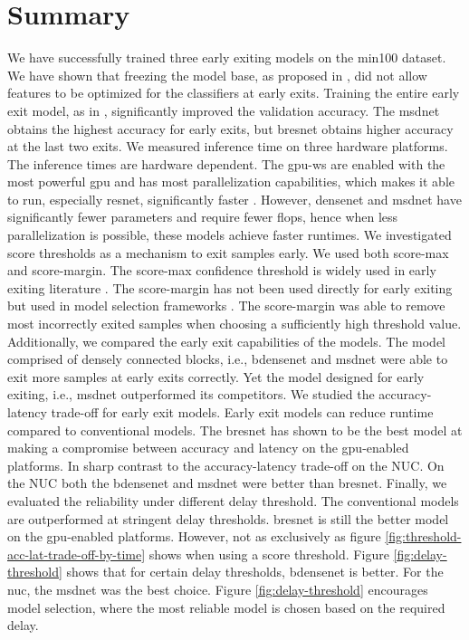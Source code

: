\section{Summary} \label{sec:ee-summary}
We have successfully trained three early exiting models on the \gls{min100} dataset. We have shown that freezing the model base, as proposed in \cite{leroux_resource-constrained_2015}, did not allow features to be optimized for the classifiers at early exits. Training the entire early exit model, as in \cite{teerapittayanon_branchynet:_2016}, significantly improved the validation accuracy. The \gls{msdnet} obtains the highest accuracy for early exits, but \gls{bresnet} obtains higher accuracy at the last two exits. 
We measured inference time on three hardware platforms. The inference times are hardware dependent. The \gls{gpu-ws} are enabled with the most powerful \gls{gpu} and has most parallelization capabilities, which makes it able to run, especially \gls{resnet}, significantly faster \cite{lee_energy_2019}. However, \gls{densenet} and \gls{msdnet} have significantly fewer parameters and require fewer \gls{flop}s, hence when less parallelization is possible, these models achieve faster runtimes.
We investigated score thresholds as a mechanism to exit samples early. We used both score-max and score-margin. The score-max confidence threshold is widely used in early exiting literature \cite{leroux_resource-constrained_2015, leroux_cascading_2017, kaya_shallow-deep_nodate, berestizshevsky_sacrificing_2019}. The score-margin has not been used directly for early exiting but used in model selection frameworks \cite{park_big/little_2015,tann_flexible_2018}. The score-margin was able to remove most incorrectly exited samples when choosing a sufficiently high threshold value. Additionally, we compared the early exit capabilities of the models. The model comprised of densely connected blocks, i.e., \gls{bdensenet} and \gls{msdnet} were able to exit more samples at early exits correctly. Yet the model designed for early exiting, i.e., \gls{msdnet} outperformed its competitors. 
We studied the accuracy-latency trade-off for early exit models. Early exit models can reduce runtime compared to conventional models. The \gls{bresnet} has shown to be the best model at making a compromise between accuracy and latency on the \gls{gpu}-enabled platforms. In sharp contrast to the accuracy-latency trade-off on the NUC. On the NUC both the \gls{bdensenet} and \gls{msdnet} were better than \gls{bresnet}.
Finally, we evaluated the reliability under different delay threshold. The conventional models are outperformed at stringent delay thresholds. \gls{bresnet} is still the better model on the \gls{gpu}-enabled platforms. However, not as exclusively as figure \ref{fig:threshold-acc-lat-trade-off-by-time} shows when using a score threshold. Figure \ref{fig:delay-threshold} shows that for certain delay thresholds, \gls{bdensenet} is better. For the \gls{nuc}, the \gls{msdnet} was the best choice.
Figure \ref{fig:delay-threshold} encourages model selection, where the most reliable model is chosen based on the required delay.
